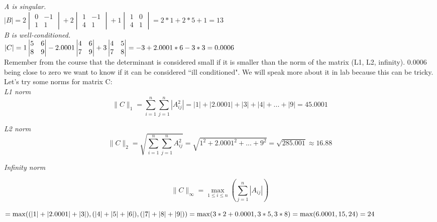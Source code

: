 \documentclass[12pt]{article}
\begin{document}
\textit{A is singular.} \\

$
\vert B \vert = 2
\begin{vmatrix}
0&-1 \\ 1&1
\end{vmatrix} + 2
\begin{vmatrix}
1&-1 \\ 4&1
\end{vmatrix} + 1
\begin{vmatrix}
1&0\\4&1
\end{vmatrix}=2*1+2*5+1=13
$ \\

\textit{B is well-conditioned.} \\

$
\vert C \vert = 1
\begin{vmatrix}
5&6 \\ 8&9
\end{vmatrix} - 2.0001
\begin{vmatrix}
4&6 \\ 7&9
\end{vmatrix} + 3
\begin{vmatrix}
4&5 \\ 7&8
\end{vmatrix} = -3 + 2.0001*6 - 3*3 = 0.0006 \\
$ \\

Remember from the course that the determinant is considered small if it is smaller than the norm of the matrix (L1, L2, infinity). 0.0006 being close to zero we want to know if it can be considered ``ill conditioned". We will speak more about it in lab because this can be tricky. Let's try some norms for matrix C: \\

\textit{L1 norm}
$$
\| C \|_1 = \sum_{i=1}^n \sum_{j=1}^n { |A_{ij}^2| } = |1| + |2.0001| + |3| + |4| + ... + |9| = 45.0001
$$

\textit{L2 norm}
$$
\| C \|_2 = \sqrt { \sum_{i=1}^n \sum_{j=1}^n { A_{ij}^2 } } = \sqrt {1^2 + 2.0001^2 + ... + 9^2} = \sqrt {285.001} \approx 16.88
$$

\textit{Infinity norm}

$$\| C \|_\infty = \max_{1 \leq i \leq n}( { \sum_{j=1}^n { |A_{ij}| } })$$

\noindent $ = \max((|1| + |2.0001| + |3|), (|4| + |5| + |6|), (|7| + |8| + |9|))
\\ = \max (3*2 + 0.0001, 3*5, 3*8)
\\ = \max (6.0001, 15, 24)
\\ = 24
$
\end{document}
